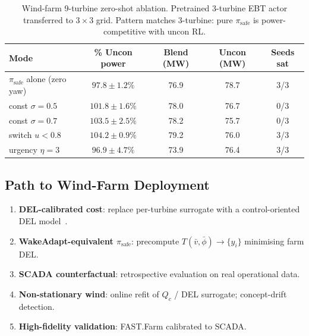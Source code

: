 \documentclass{article}
\begin{document}
\begin{table}[h]
\centering
\caption{Wind-farm 9-turbine zero-shot ablation. Pretrained 3-turbine EBT actor transferred to $3\!\times\!3$ grid. Pattern matches 3-turbine: pure $\pi_{\mathrm{safe}}$ is power-competitive with uncon RL.}
\label{tab:wf_9turb}
\begin{tabular}{lcccc}
\toprule
Mode & \% Uncon power & Blend (MW) & Uncon (MW) & Seeds sat \\
\midrule
$\pi_{\mathrm{safe}}$ alone (zero yaw) & $97.8\!\pm\!1.2\%$  & 76.9 & 78.7 & 3/3 \\
const $\sigma\!=\!0.5$                  & $101.8\!\pm\!1.6\%$ & 78.0 & 76.7 & 0/3 \\
const $\sigma\!=\!0.7$                  & $103.5\!\pm\!2.5\%$ & 78.2 & 75.7 & 0/3 \\
switch $u\!<\!0.8$                      & $104.2\!\pm\!0.9\%$ & 79.2 & 76.0 & 3/3 \\
urgency $\eta\!=\!3$                    & $96.9\!\pm\!4.7\%$  & 73.9 & 76.4 & 3/3 \\
\bottomrule
\end{tabular}
\end{table}

\subsection{Path to Wind-Farm Deployment}
\label{app:deployment}

\begin{enumerate}[leftmargin=*]
    \item \textbf{DEL-calibrated cost}: replace per-turbine surrogate with a control-oriented DEL model~\citep{wes2024DEL, guillore2024sectoravg}.
    \item \textbf{WakeAdapt-equivalent $\pi_{\mathrm{safe}}$}: precompute $T(\bar v, \bar\phi)\to\{y_i\}$ minimising farm DEL.
    \item \textbf{SCADA counterfactual}: retrospective evaluation on real operational data.
    \item \textbf{Non-stationary wind}: online refit of $Q_c$ / DEL surrogate; concept-drift detection.
    \item \textbf{High-fidelity validation}: FAST.Farm calibrated to SCADA.
\end{enumerate}



\end{document}
